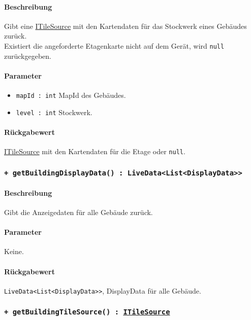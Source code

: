 \paragraph*{Beschreibung}
Gibt eine \href{https://osmdroid.github.io/osmdroid/javadocAll/org/osmdroid/tileprovider/tilesource/ITileSource.html}
{ITileSource} mit den Kartendaten für das Stockwerk eines Gebäudes zurück.\\
Existiert die angeforderte Etagenkarte nicht auf dem Gerät, wird \texttt{null} zurückgegeben.
\paragraph*{Parameter}
\begin{itemize}
    \item \texttt{mapId : int} MapId des Gebäudes.
    \item \texttt{level : int} Stockwerk.
\end{itemize}
\paragraph*{Rückgabewert}
\href{https://osmdroid.github.io/osmdroid/javadocAll/org/osmdroid/tileprovider/tilesource/ITileSource.html}
{ITileSource} mit den Kartendaten für die Etage oder \texttt{null}.

\subsubsection*{\texttt{+ getBuildingDisplayData() : LiveData<List<DisplayData>>}}%
\paragraph*{Beschreibung}
Gibt die Anzeigedaten für alle Gebäude zurück.
\paragraph*{Parameter}
Keine.
\paragraph*{Rückgabewert}
\texttt{LiveData<List<DisplayData>>}, DisplayData für alle Gebäude.

\subsubsection*{\texttt{+ getBuildingTileSource() : \href{https://osmdroid.github.io/osmdroid/javadocAll/org/osmdroid/tileprovider/tilesource/ITileSource.html}
{ITileSource}}}%
